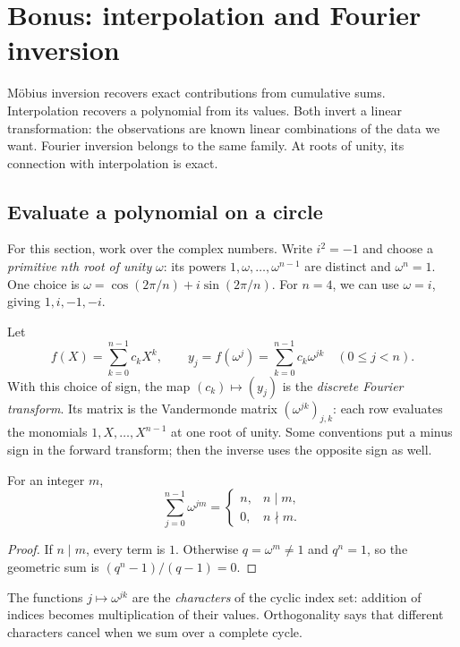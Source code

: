 \section{Bonus: interpolation and Fourier inversion}
\label{sec:fourier-interpolation}

M\"obius inversion recovers exact contributions from cumulative sums.
Interpolation recovers a polynomial from its values. Both invert a
linear transformation: the observations are known linear combinations
of the data we want. Fourier inversion belongs to the same family.
At roots of unity, its connection with interpolation is exact.

\subsection{Evaluate a polynomial on a circle}

For this section, work over the complex numbers. Write $i^2=-1$ and
choose a \emph{primitive $n$th root of unity} $\omega$: its powers
$1,\omega,\ldots,\omega^{n-1}$ are distinct and $\omega^n=1$.
One choice is $\omega=\cos(2\pi/n)+i\sin(2\pi/n)$.
For $n=4$, we can use $\omega=i$, giving $1,i,-1,-i$.

Let
\[
 f(X)=\sum_{k=0}^{n-1}c_kX^k,
 \qquad y_j=f(\omega^j)=\sum_{k=0}^{n-1}c_k\omega^{jk}
 \quad(0\le j<n).
\]
With this choice of sign, the map $(c_k)\mapsto(y_j)$ is the
\emph{discrete Fourier transform}. Its matrix is the Vandermonde
matrix $(\omega^{jk})_{j,k}$: each row evaluates the monomials
$1,X,\ldots,X^{n-1}$ at one root of unity.
Some conventions put a minus sign in the forward transform; then
the inverse uses the opposite sign as well.

\begin{lemma}
For an integer $m$,
\[
 \sum_{j=0}^{n-1}\omega^{jm}
 =\begin{cases}n,&n\mid m,\\0,&n\nmid m.\end{cases}
\]
\end{lemma}
\begin{proof}
If $n\mid m$, every term is $1$. Otherwise $q=\omega^m\ne1$
and $q^n=1$, so the geometric sum is $(q^n-1)/(q-1)=0$.
\end{proof}

The functions $j\mapsto\omega^{jk}$ are the \emph{characters} of
the cyclic index set: addition of indices becomes multiplication
of their values. Orthogonality says that different characters
cancel when we sum over a complete cycle.

